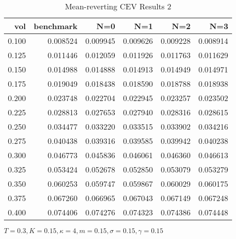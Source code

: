 \begin{table}[ht]
\centering
\caption{Mean-reverting CEV Results 2}
\begin{tabular}{rrrrrr}
\toprule
  vol &       benchmark &       N=0 &       N=1 &       N=2 &       N=3 \\
\midrule
0.100 & 0.008524 & 0.009945 & 0.009626 & 0.009228 & 0.008914 \\
0.125 & 0.011446 & 0.012059 & 0.011926 & 0.011763 & 0.011629 \\
0.150 & 0.014988 & 0.014888 & 0.014913 & 0.014949 & 0.014971 \\
0.175 & 0.019049 & 0.018438 & 0.018590 & 0.018788 & 0.018938 \\
0.200 & 0.023748 & 0.022704 & 0.022945 & 0.023257 & 0.023502 \\
0.225 & 0.028813 & 0.027653 & 0.027940 & 0.028316 & 0.028615 \\
0.250 & 0.034477 & 0.033220 & 0.033515 & 0.033902 & 0.034216 \\
0.275 & 0.040438 & 0.039316 & 0.039585 & 0.039942 & 0.040238 \\
0.300 & 0.046773 & 0.045836 & 0.046061 & 0.046360 & 0.046613 \\
0.325 & 0.053424 & 0.052678 & 0.052850 & 0.053079 & 0.053279 \\
0.350 & 0.060253 & 0.059747 & 0.059867 & 0.060029 & 0.060175 \\
0.375 & 0.067260 & 0.066965 & 0.067043 & 0.067149 & 0.067248 \\
0.400 & 0.074406 & 0.074276 & 0.074323 & 0.074386 & 0.074448 \\
\bottomrule
\end{tabular}
\small{$T=0.3,K=0.15, \kappa = 4,m=0.15, \sigma = 0.15, \gamma = 0.15$}
\end{table}

